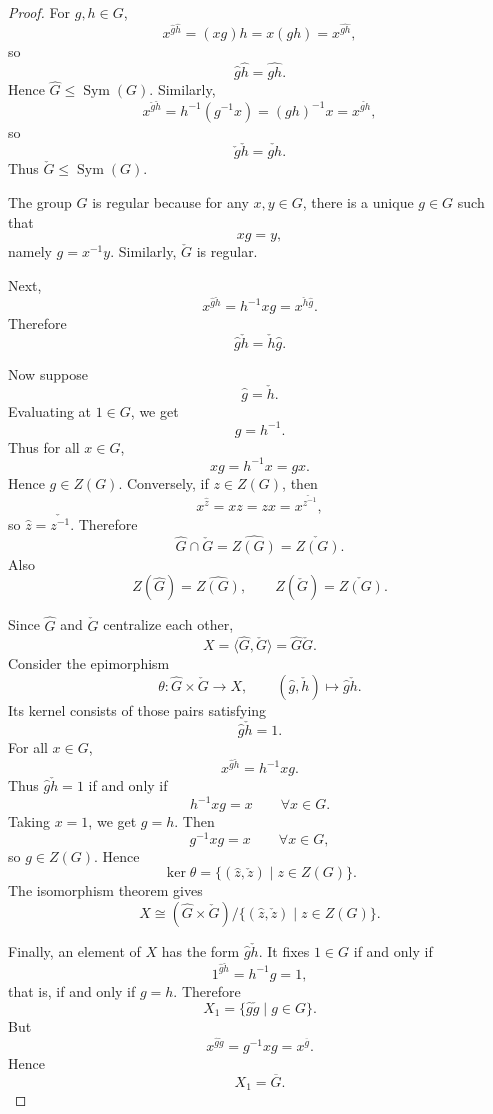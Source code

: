 \begin{proof}
For \(g,h\in G\),
\[
    x^{\widehat g\widehat h}=(xg)h=x(gh)=x^{\widehat{gh}},
\]
so
\[
    \widehat g\widehat h=\widehat{gh}.
\]
Hence \(\widehat G\leq \operatorname{Sym}(G)\). Similarly,
\[
    x^{\check g\check h}
    =
    h^{-1}(g^{-1}x)
    =
    (gh)^{-1}x
    =
    x^{\check{gh}},
\]
so
\[
    \check g\check h=\check{gh}.
\]
Thus \(\check G\leq \operatorname{Sym}(G)\).

The group \(\widehat G\) is regular because for any \(x,y\in G\), there is a unique \(g\in G\)
such that
\[
    xg=y,
\]
namely \(g=x^{-1}y\). Similarly, \(\check G\) is regular.

Next,
\[
    x^{\widehat g\check h}
    =
    h^{-1}xg
    =
    x^{\check h\widehat g}.
\]
Therefore
\[
    \widehat g\check h=\check h\widehat g.
\]

Now suppose
\[
    \widehat g=\check h.
\]
Evaluating at \(1\in G\), we get
\[
    g=h^{-1}.
\]
Thus for all \(x\in G\),
\[
    xg=h^{-1}x=gx.
\]
Hence \(g\in Z(G)\). Conversely, if \(z\in Z(G)\), then
\[
    x^{\widehat z}=xz=zx=x^{\check{z^{-1}}},
\]
so \(\widehat z=\check{z^{-1}}\). Therefore
\[
    \widehat G\cap \check G=\widehat{Z(G)}=\check{Z(G)}.
\]
Also
\[
    Z(\widehat G)=\widehat{Z(G)},\qquad
    Z(\check G)=\check{Z(G)}.
\]

Since \(\widehat G\) and \(\check G\) centralize each other,
\[
    X=\langle \widehat G,\check G\rangle=\widehat G\check G.
\]
Consider the epimorphism
\[
    \theta:\widehat G\times \check G\to X,
    \qquad
    (\widehat g,\check h)\mapsto \widehat g\check h.
\]
Its kernel consists of those pairs satisfying
\[
    \widehat g\check h=1.
\]
For all \(x\in G\),
\[
    x^{\widehat g\check h}=h^{-1}xg.
\]
Thus \(\widehat g\check h=1\) if and only if
\[
    h^{-1}xg=x
    \qquad \forall x\in G.
\]
Taking \(x=1\), we get \(g=h\). Then
\[
    g^{-1}xg=x
    \qquad \forall x\in G,
\]
so \(g\in Z(G)\). Hence
\[
    \ker\theta=
    \{(\widehat z,\check z)\mid z\in Z(G)\}.
\]
The isomorphism theorem gives
\[
    X\cong
    (\widehat G\times \check G)/
    \{(\widehat z,\check z)\mid z\in Z(G)\}.
\]

Finally, an element of \(X\) has the form \(\widehat g\check h\). It fixes \(1\in G\) if and
only if
\[
    1^{\widehat g\check h}=h^{-1}g=1,
\]
that is, if and only if \(g=h\). Therefore
\[
    X_1=\{\widehat g\check g\mid g\in G\}.
\]
But
\[
    x^{\widehat g\check g}
    =
    g^{-1}xg
    =
    x^{\overline g}.
\]
Hence
\[
    X_1=\overline G.
\]
\end{proof}

